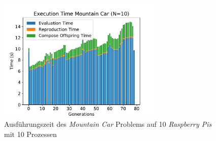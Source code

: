 \begin{figure}[!h]
	\centering
	\includegraphics[width=0.7\textwidth]{./img/mountain_car_analysis/1413_time_10cores_10pis.pdf} 
	\caption{Ausführungszeit des \emph{Mountain Car} Problems auf 10 \emph{Raspberry Pis} mit 10 Prozessen}
	\label{fig:mountain_car_time_10cores_10pi}
\end{figure}




